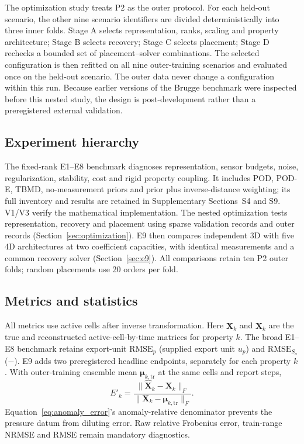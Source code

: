 

The optimization study treats P2 as the outer protocol. For each held-out scenario, the other nine scenario identifiers are divided deterministically into three inner folds. Stage A selects representation, ranks, scaling and property architecture; Stage B selects recovery; Stage C selects placement; Stage D rechecks a bounded set of placement--solver combinations. The selected configuration is then refitted on all nine outer-training scenarios and evaluated once on the held-out scenario. The outer data never change a configuration within this run. Because earlier versions of the Brugge benchmark were inspected before this nested study, the design is post-development rather than a preregistered external validation.

\subsection{Experiment hierarchy}
\label{sec:exp_list}
The fixed-rank E1--E8 benchmark diagnoses representation, sensor budgets, noise, regularization, stability, cost and rigid property coupling. It includes POD, POD-E, TBMD, no-measurement priors and prior plus inverse-distance weighting; its full inventory and results are retained in Supplementary Sections~S4 and S9. V1/V3 verify the mathematical implementation. The nested optimization tests representation, recovery and placement using \OptValidationRecords{} sparse validation records and \OptOuterRecords{} outer records (Section~\ref{sec:optimization}). E9 then compares independent 3D with five 4D architectures at two coefficient capacities, with identical measurements and a common recovery solver (Section~\ref{sec:e9}). All comparisons retain ten P2 outer folds; random placements use 20 orders per fold.

\subsection{Metrics and statistics}
\label{sec:metrics}
All metrics use active cells after inverse transformation. Here $\mathbf X_k$ and $\widehat{\mathbf X}_k$ are the true and reconstructed active-cell-by-time matrices for property $k$. The broad E1--E8 benchmark retains export-unit $\mathrm{RMSE}_p$ (supplied export unit $u_p$) and $\mathrm{RMSE}_{S_o}$ ($-$). E9 adds two preregistered headline endpoints, separately for each property $k$. With outer-training ensemble mean $\boldsymbol\mu_{k,\mathrm{tr}}$ at the same cells and report steps,
\begin{equation}
E'_k=\frac{\lVert\widehat{\mathbf X}_k-\mathbf X_k\rVert_F}{\lVert\mathbf X_k-\boldsymbol\mu_{k,\mathrm{tr}}\rVert_F}.\label{eq:anomaly_error}
\end{equation}
Equation~\eqref{eq:anomaly_error}'s anomaly-relative denominator prevents the pressure datum from diluting error. Raw relative Frobenius error, train-range NRMSE and RMSE remain mandatory diagnostics.

